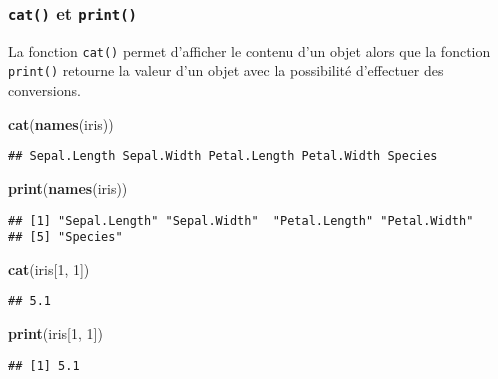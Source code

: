 \documentclass[]{book}
\newenvironment{Shaded}{\begin{snugshade}}{\end{snugshade}}
\newcommand{\KeywordTok}[1]{\textcolor[rgb]{0.13,0.29,0.53}{\textbf{#1}}}
\newcommand{\DecValTok}[1]{\textcolor[rgb]{0.00,0.00,0.81}{#1}}
\newcommand{\NormalTok}[1]{#1}
\theoremstyle{definition}
\theoremstyle{definition}
\theoremstyle{definition}
\theoremstyle{remark}
\begin{document}
\subsubsection{\texorpdfstring{\texttt{cat()} et
\texttt{print()}}{cat() et print()}}\label{l015print}

La fonction \texttt{cat()} permet d'afficher le contenu d'un objet alors
que la fonction \texttt{print()} retourne la valeur d'un objet avec la
possibilité d'effectuer des conversions.

\begin{Shaded}
\begin{Highlighting}[]
\KeywordTok{cat}\NormalTok{(}\KeywordTok{names}\NormalTok{(iris))}
\end{Highlighting}
\end{Shaded}

\begin{verbatim}
## Sepal.Length Sepal.Width Petal.Length Petal.Width Species
\end{verbatim}

\begin{Shaded}
\begin{Highlighting}[]
\KeywordTok{print}\NormalTok{(}\KeywordTok{names}\NormalTok{(iris))}
\end{Highlighting}
\end{Shaded}

\begin{verbatim}
## [1] "Sepal.Length" "Sepal.Width"  "Petal.Length" "Petal.Width" 
## [5] "Species"
\end{verbatim}

\begin{Shaded}
\begin{Highlighting}[]
\KeywordTok{cat}\NormalTok{(iris[}\DecValTok{1}\NormalTok{, }\DecValTok{1}\NormalTok{])}
\end{Highlighting}
\end{Shaded}

\begin{verbatim}
## 5.1
\end{verbatim}

\begin{Shaded}
\begin{Highlighting}[]
\KeywordTok{print}\NormalTok{(iris[}\DecValTok{1}\NormalTok{, }\DecValTok{1}\NormalTok{])}
\end{Highlighting}
\end{Shaded}

\begin{verbatim}
## [1] 5.1
\end{verbatim}
\end{document}
